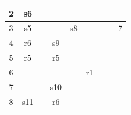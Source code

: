 \documentclass{article}
\begin{document}
\begin{latin}
\begin{table}[H]
\begin{tabular}{|ccccccccc|}
\multicolumn{1}{|c|}{{\color[HTML]{0000FF} 2}}         & \multicolumn{1}{c|}{s6}         & \multicolumn{1}{c|}{}           & \multicolumn{1}{c|}{}           & \multicolumn{1}{c|}{}           & \multicolumn{1}{c|}{}                           & \multicolumn{1}{c|}{}            & \multicolumn{1}{c|}{}                         &                          \\ \hline
\multicolumn{1}{|c|}{{\color[HTML]{0000FF} 3}}         & \multicolumn{1}{c|}{s5}         & \multicolumn{1}{c|}{}           & \multicolumn{1}{c|}{}           & \multicolumn{1}{c|}{s8}         & \multicolumn{1}{c|}{}                           & \multicolumn{1}{c|}{}            & \multicolumn{1}{c|}{}                         & {\color[HTML]{0000FF} 7} \\ \hline
\multicolumn{1}{|c|}{{\color[HTML]{0000FF} 4}}         & \multicolumn{1}{c|}{r6}         & \multicolumn{1}{c|}{}           & \multicolumn{1}{c|}{s9}         & \multicolumn{1}{c|}{}           & \multicolumn{1}{c|}{}                           & \multicolumn{1}{c|}{}            & \multicolumn{1}{c|}{}                         &                          \\ \hline
\multicolumn{1}{|c|}{{\color[HTML]{0000FF} 5}}         & \multicolumn{1}{c|}{r5}         & \multicolumn{1}{c|}{}           & \multicolumn{1}{c|}{r5}         & \multicolumn{1}{c|}{}           & \multicolumn{1}{c|}{}                           & \multicolumn{1}{c|}{}            & \multicolumn{1}{c|}{}                         &                          \\ \hline
\multicolumn{1}{|c|}{{\color[HTML]{0000FF} 6}}         & \multicolumn{1}{c|}{}           & \multicolumn{1}{c|}{}           & \multicolumn{1}{c|}{}           & \multicolumn{1}{c|}{}           & \multicolumn{1}{c|}{r1}                         & \multicolumn{1}{c|}{}            & \multicolumn{1}{c|}{}                         &                          \\ \hline
\multicolumn{1}{|c|}{{\color[HTML]{0000FF} 7}}         & \multicolumn{1}{c|}{}           & \multicolumn{1}{c|}{}           & \multicolumn{1}{c|}{s10}        & \multicolumn{1}{c|}{}           & \multicolumn{1}{c|}{}                           & \multicolumn{1}{c|}{}            & \multicolumn{1}{c|}{}                         &                          \\ \hline
\multicolumn{1}{|c|}{{\color[HTML]{0000FF} 8}}         & \multicolumn{1}{c|}{s11}        & \multicolumn{1}{c|}{}           & \multicolumn{1}{c|}{r6}         & \multicolumn{1}{c|}{}           & \multicolumn{1}{c|}{}                           & \multicolumn{1}{c|}{}            & \multicolumn{1}{c|}{}                         &                          \\ \hline

\end{tabular}
\end{table}
\end{latin}
\end{document}
